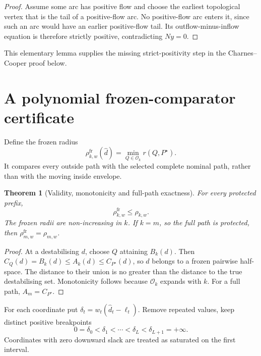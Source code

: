 \documentclass[11pt]{article}
\newtheorem{theorem}{Theorem}[section]
\theoremstyle{definition}
\newcommand{\cO}{\mathcal{O}}
\newcommand{\dhat}{\widehat d}
\newcommand{\ellv}{\ell}
\newcommand{\rhofr}{\rho^{\mathrm{fr}}}
\begin{document}
\begin{proof}
Assume some arc has positive flow and choose the earliest topological vertex that is the tail of a positive-flow arc. No positive-flow arc enters it, since such an arc would have an earlier positive-flow tail. Its outflow-minus-inflow equation is therefore strictly positive, contradicting $Ny=0$.
\end{proof}

This elementary lemma supplies the missing strict-positivity step in the Charnes--Cooper proof below.

\section{A polynomial frozen-comparator certificate}\label{sec:certificate}

Define the frozen radius
\begin{equation}\label{eq:frozen}
\rhofr_{k,w}(\dhat)=\min_{Q\in\cO_k}r(Q,P^\star).
\end{equation}
It compares every outside path with the selected complete nominal path, rather than with the moving inside envelope.

\begin{theorem}[Validity, monotonicity and full-path exactness]\label{thm:lower}
For every protected prefix,
\[
\rhofr_{k,w}\le\rho_{k,w}.
\]
The frozen radii are non-increasing in $k$. If $k=m$, so the full path is protected, then $\rhofr_{m,w}=\rho_{m,w}$.
\end{theorem}

\begin{proof}
At a destabilising $d$, choose $Q$ attaining $B_k(d)$. Then
$C_Q(d)=B_k(d)\le A_k(d)\le C_{P^\star}(d)$,
so $d$ belongs to a frozen pairwise half-space. The distance to their union is no greater than the distance to the true destabilising set. Monotonicity follows because $\cO_k$ expands with $k$. For a full path, $A_m=C_{P^\star}$.
\end{proof}

For each coordinate put $\delta_t=w_t(\dhat_t-\ellv_t)$. Remove repeated values, keep distinct positive breakpoints
\[
0=\delta_0<\delta_1<\cdots<\delta_L<\delta_{L+1}=+\infty.
\]
Coordinates with zero downward slack are treated as saturated on the first interval.
\end{document}
